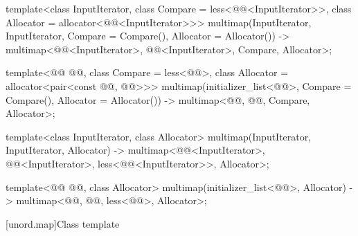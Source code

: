 \documentclass{wg21}
\begin{document}
\begin{codeblock}
{template<class InputIterator, class Compare = less<@@<InputIterator>>,
class Allocator = allocator<@@<InputIterator>>>
multimap(InputIterator, InputIterator, Compare = Compare(), Allocator = Allocator())
-> multimap<@@<InputIterator>, @@<InputIterator>,
Compare, Allocator>;

template<@@ @@, class Compare = less<@@>,
class Allocator = allocator<pair<const @@,  @@>>>
multimap(initializer_list<@@>, Compare = Compare(), Allocator = Allocator())
-> multimap<@@, @@, Compare, Allocator>;

template<class InputIterator, class Allocator>
multimap(InputIterator, InputIterator, Allocator)
-> multimap<@@<InputIterator>, @@<InputIterator>,
less<@@<InputIterator>>, Allocator>;

template<@@ @@, class Allocator>
multimap(initializer_list<@@>, Allocator)
-> multimap<@@, @@, less<@@>, Allocator>;
}
\end{codeblock}%
%


[unord.map]{Class template }%
\end{document}
